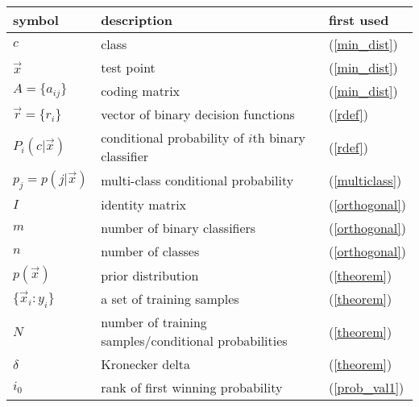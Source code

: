 \begin{tabular}{lll}
symbol & description & first used \\\hline
	$c$ & class & (\ref{min_dist}) \\
	$\vec x$ & test point & (\ref{min_dist})\\
	$A = \lbrace a_{ij} \rbrace$ & coding matrix & (\ref{min_dist})\\
	$\vec r = \lbrace r_i \rbrace$ & vector of binary decision functions & (\ref{rdef}) \\
	$P_i(c | \vec x)$ & conditional probability of $i$th binary classifier & (\ref{rdef})\\
	$p_j = p(j | \vec x)$ & multi-class conditional probability & (\ref{multiclass})\\
	$I$ & identity matrix & (\ref{orthogonal})\\
	$m$ & number of binary classifiers & (\ref{orthogonal}) \\
	$n$ & number of classes & (\ref{orthogonal})\\
	$p(\vec x)$ & prior distribution & (\ref{theorem}) \\
	$\lbrace \vec x_i:y_i \rbrace$ & a set of training samples & (\ref{theorem}) \\
	$N$ & number of training samples/conditional probabilities & (\ref{theorem})\\
	$\delta$ & Kronecker delta & (\ref{theorem}) \\
	$i_0$ & rank of first winning probability & (\ref{prob_val1})\\
\end{tabular}

